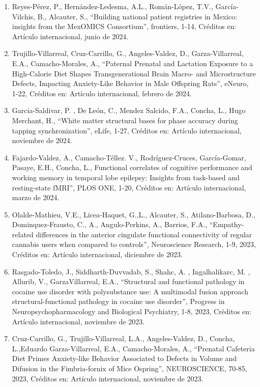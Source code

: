 \documentclass[12pt]{article}
\begin{document}
\begin{enumerate}
\item Reyes-Pérez, P., Hernández-Ledesma, A.L., Román-López, T.V., García-Vilchis, B., Alcauter, S., “Building national patient 
registries 
in Mexico: insights from the MexOMICS Consortium”, frontiers, 1-14, Créditos en: Artículo internacional, junio de 2024.

\item Trujillo-Villarreal, Cruz-Carrillo, G., Angeles-Valdez, D., Garza-Villarreal, E.A., Camacho-Morales, A., “Paternal Prenatal and 
Lactation Exposure to a High-Calorie Diet Shapes Transgenerational Brain Macro- and Microstructure Defects, Impacting Anxiety-Like 
Behavior in Male Offspring Rats”, eNeuro, 1-22, Créditos en: Artículo internacional, febrero de 2024.

\item Garcia-Saldivar, P. , De León, C., Mendez Salcido, F.A., Concha, L., Hugo Merchant, H., “White matter structural bases for phase 
accuracy during tapping synchronization”, eLife, 1-27, Créditos en: Artículo internacional, noviembre de 2024.

\item Fajardo-Valdez, A., Camacho-Téllez. V., Rodríguez-Cruces, García-Gomar, Pasaye, E.H., Concha, L., Functional correlates of 
cognitive performance and working memory in temporal lobe epilepsy: Insights from task-based and resting-state fMRI”, PLOS ONE, 1-20, 
Créditos en: Artículo internacional, marzo de 2024.

\item Olalde-Mathieu, V.E., Licea-Haquet, G.,L., Alcauter, S., Atilano-Barbosa, D., Dominquez-Frausto, C., A., Angulo-Perkins, A., 
Barrios, F.A., “Empathy-related differences in the anterior cingulate functional connectivity of regular cannabis users when compared 
to controls”, Neuroscience Research, 1-9, 2023, Créditos en: Artículo internacional, diciembre de 2023.

\item Rasgado-Toledo, J., Siddharth-Duvvadab, S., Shahc, A. , Ingalhalikarc, M. , Allurib, V., GarzaVillarreal, E.A., “Structural and 
functional pathology in cocaine use disorder with polysubstance use: A multimodal fusion approach structural-functional pathology in 
cocaine use disorder”, Progress in Neuropsychopharmacology and Biological Psychiatry, 1-8, 2023, Créditos en: Artículo internacional, 
noviembre de 2023.

\item Cruz-Carrillo, G., Trujillo-Villarreal, L.A., Angeles-Valdez, D., Concha, L.,Eduardo Garza-Villarreal, E.A., Camacho-Morales, A., 
“Prenatal Cafeteria Diet Primes Anxiety-like Behavior Associated to Defects in Volume and Difusion in the Fimbria-fornix of Mice 
Ospring”, NEUROSCIENCE, 70-85, 2023, Créditos en: Artículo internacional, noviembre de 2023.


\end{enumerate}
\end{document}
